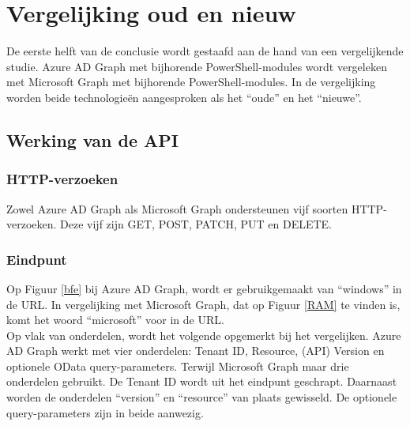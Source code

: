 
\chapter{Vergelijking oud en nieuw}%
\label{ch:vergelijking}

De eerste helft van de conclusie wordt gestaafd aan de hand van een vergelijkende studie. Azure \ac{AD} Graph met bijhorende PowerShell-modules wordt vergeleken met Microsoft Graph met bijhorende PowerShell-modules. In de vergelijking worden beide technologieën aangesproken als het “oude” en het “nieuwe”. 

\section{Werking van de API}


  

\subsection{HTTP-verzoeken}

Zowel Azure \ac{AD} Graph als Microsoft Graph ondersteunen vijf soorten \ac{HTTP}-verzoeken. Deze vijf zijn GET, POST, PATCH, PUT en DELETE. 

\subsection{Eindpunt}

Op Figuur \ref{bfe} bij Azure \ac{AD} Graph, wordt er gebruikgemaakt van “windows” in de \ac{URL}. In vergelijking met Microsoft Graph, dat op Figuur \ref{RAM} te vinden is, komt het woord “microsoft” voor in de \ac{URL}. \\

Op vlak van onderdelen, wordt het volgende opgemerkt bij het vergelijken. Azure \ac{AD} Graph werkt met vier onderdelen: Tenant ID, Resource, (\ac{API}) Version en optionele OData query-parameters. Terwijl Microsoft Graph maar drie onderdelen gebruikt. De Tenant ID wordt uit het eindpunt geschrapt. Daarnaast worden de onderdelen “version” en “resource” van plaats gewisseld. De optionele query-parameters zijn in beide aanwezig. 





